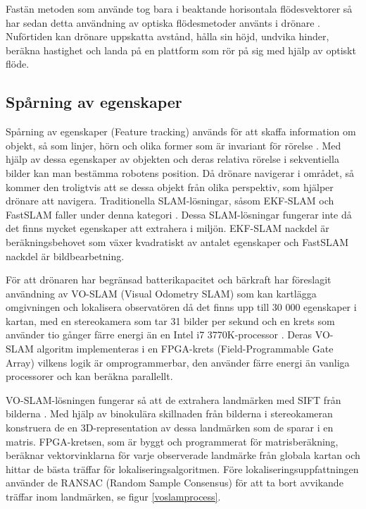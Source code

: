 Fastän metoden som \cite{341094} använde tog bara i beaktande horisontala flödesvektorer så har sedan detta användning av optiska flödesmetoder använts i drönare \citep{6564752}. Nuförtiden kan drönare uppskatta avstånd, hålla sin höjd, undvika hinder, beräkna hastighet och landa på en plattform som rör på sig med hjälp av optiskt flöde.

\subsection{Spårning av egenskaper}

Spårning av egenskaper (Feature tracking) används för att skaffa information om objekt, så som linjer, hörn och olika former som är invariant för rörelse \citep{geospatial}. Med hjälp av dessa egenskaper av objekten och deras relativa rörelse i sekventiella bilder kan man bestämma robotens position. Då drönare navigerar i området, så kommer den troligtvis att se dessa objekt från olika perspektiv, som hjälper drönare att navigera. Traditionella SLAM-lösningar, såsom EKF-SLAM och FastSLAM faller under denna kategori \citep{voslamlatif}. Dessa SLAM-lösningar fungerar inte då det finns mycket egenskaper att extrahera i miljön. EKF-SLAM nackdel är beräkningsbehovet som växer kvadratiskt av antalet egenskaper och FastSLAM nackdel är bildbearbetning.

För att drönaren har begränsad batterikapacitet och bärkraft har \cite{voslam} föreslagit användning av VO-SLAM (Visual Odometry SLAM) som kan kartlägga omgivningen och lokalisera observatören då det finns upp till 30 000 egenskaper i kartan, med en stereokamera som tar 31 bilder per sekund och en krets som använder tio gånger färre energi än en Intel i7 3770K-processor \citep{voslam}. Deras VO-SLAM algoritm implementeras i en FPGA-krets (Field-Programmable Gate Array) vilkens logik är omprogrammerbar, den använder färre energi än vanliga processorer och kan beräkna parallellt. 

VO-SLAM-lösningen fungerar så att de extrahera landmärken med SIFT från bilderna \citep{voslam}. Med hjälp av binokulära skillnaden från bilderna i stereokameran konstruera de en 3D-representation av dessa landmärken som de sparar i en matris. FPGA-kretsen, som är byggt och programmerat för matrisberäkning, beräknar vektorvinklarna för varje observerade landmärke från globala kartan och hittar de bästa träffar för lokaliseringsalgoritmen. Före lokaliseringsuppfattningen använder de RANSAC (Random Sample Consensus) för att ta bort avvikande träffar inom landmärken, se figur \ref{voslamprocess}. 

